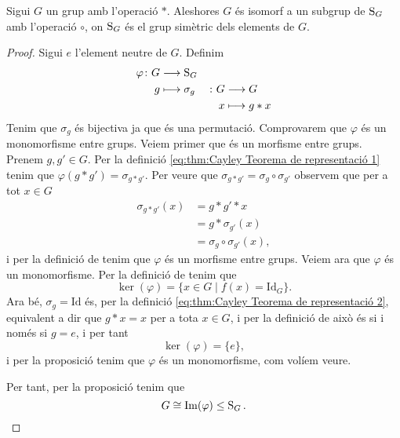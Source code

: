 \documentclass[../../Main.tex]{subfiles}
\begin{document}
	\begin{theorem}
		\label{thm:Cayley Teorema de representació}
		Sigui \(G\) un grup amb l'operació \(\ast\). Aleshores \(G\) és isomorf a un subgrup de \(\operatorname{S}_{G}\) amb l'operació \(\circ\), on \(\operatorname{S}_{G}\) és el grup simètric dels elements de \(G\). %
		\begin{proof}
			Sigui \(e\) l'element neutre de \(G\). Definim
			\begin{alignat}{2}
			\varphi\colon G&\longrightarrow\operatorname{S}_{G}&&\label{eq:thm:Cayley Teorema de representació 1}\\
			g&\longmapsto\sigma_{g}&\colon G&\longrightarrow G\label{eq:thm:Cayley Teorema de representació 2}\\
			&&x&\longmapsto g\ast x\nonumber
			\end{alignat}
			Tenim que \(\sigma_{g}\) és bijectiva ja que és una permutació. %
			Comprovarem que \(\varphi\) és un monomorfisme entre grups. Veiem primer que és un morfisme entre grups. Prenem \(g,g'\in G\). Per la definició \eqref{eq:thm:Cayley Teorema de representació 1} tenim que \(\varphi(g\ast g')=\sigma_{g\ast g'}\). Per veure que \(\sigma_{g\ast g'}=\sigma_{g}\circ\sigma_{g'}\) observem que per a tot \(x\in G\)
			\begin{align*}
			\sigma_{g\ast g'}(x)&=g\ast g'\ast x\\
			&=g\ast\sigma_{g'}(x)\\
			&=\sigma_{g}\circ\sigma_{g'}(x),
			\end{align*}
			i per la definició de  tenim que \(\varphi\) és un morfisme entre grups. Veiem ara que \(\varphi\) és un monomorfisme. Per la definició de  tenim que
			\[\ker(\varphi)=\{x\in G\mid f(x)=\text{Id}_{G}\}.\]
			Ara bé, \(\sigma_{g}=\text{Id}\) és, per la definició \eqref{eq:thm:Cayley Teorema de representació 2}, equivalent a dir que \(g\ast x=x\) per a tota \(x\in G\), i per la definició de  això és si i només si \(g=e\), i per tant
			\[\ker(\varphi)=\{e\},\]
			i per la proposició  tenim que \(\varphi\) és un monomorfisme, com volíem veure.
			
			Per tant, per la proposició  tenim que
			\[G\cong \operatorname{Im}(\varphi)\leq\operatorname{S}_{G}.\qedhere\]
		\end{proof}
	\end{theorem}
\end{document}
